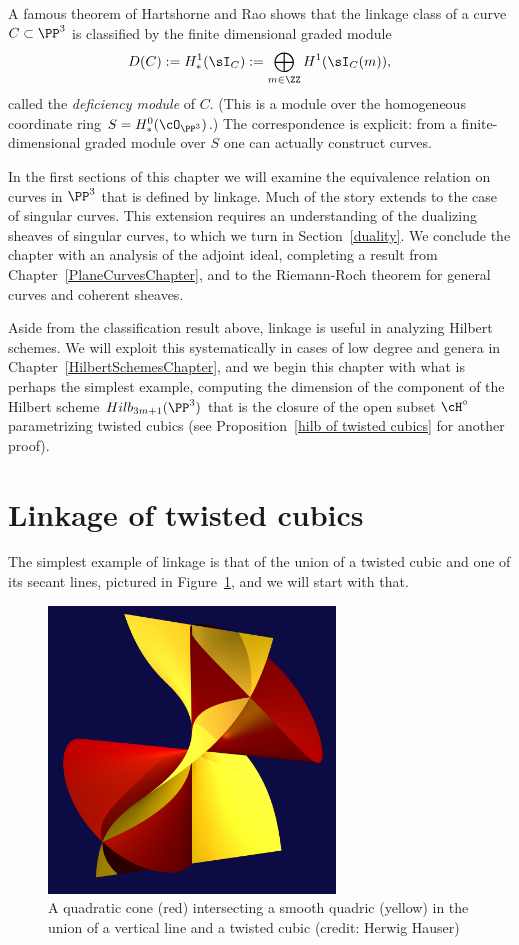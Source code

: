 A famous theorem of Hartshorne and Rao \cite{MR520926} shows that the linkage class of a curve $C\subset \PP^3$
is classified by the finite dimensional graded module 
$$
D(C) :=H^1_*(\sI_C):=\bigoplus_{m\in \ZZ} H^1(\sI_C(m)),
$$
called the \emph{deficiency module} of $C$. (This is a module over the homogeneous coordinate ring $S = H^0_*(\cO_{\PP^3})$.) The correspondence is explicit: from a finite-dimensional graded module over $S$ one can
actually construct curves.

In the first sections of this chapter we will examine the equivalence relation on curves in $\PP^3$ that is defined by linkage. Much of the story extends to the case of singular curves. This extension requires an understanding of the
dualizing sheaves of singular curves, to which we turn in Section~\ref{duality}. We conclude the chapter with an analysis of the adjoint ideal, completing a result from Chapter~\ref{PlaneCurvesChapter},  and to the Riemann-Roch theorem for general curves and coherent sheaves.

Aside from the classification result above, linkage is useful in analyzing Hilbert schemes. We will exploit this systematically in cases of low degree and genera in Chapter~\ref{HilbertSchemesChapter}, and we begin
this chapter with what is perhaps the simplest example, computing the dimension of the component of
the Hilbert scheme $Hilb_{3m+1}(\PP^3)$ that is the closure of the open subset $\cH^\circ$  parametrizing twisted cubics (see Proposition~\ref{hilb of twisted cubics} for another proof).

\section{Linkage of twisted cubics}
The simplest example of linkage is that of the union of a twisted cubic and one of its secant lines, pictured in
Figure~\ref{cubicAndLine}, and we will start with that.

\begin{figure}
\centerline {\includegraphics[height=3in]{"main/Fig15-1-TwistAndShout"}}
 \caption{A quadratic cone (red) intersecting a smooth quadric (yellow) in the union of a vertical line and a twisted cubic (credit: Herwig Hauser)}
 \label{cubicAndLine}
\end{figure}

